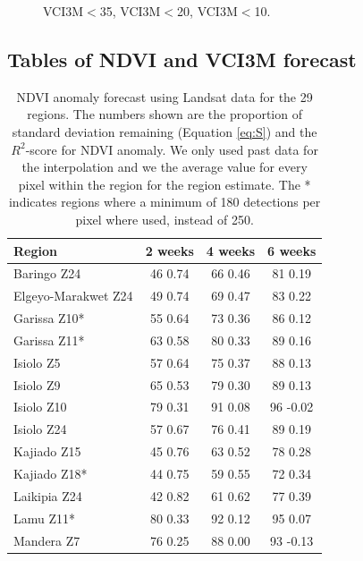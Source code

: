 \documentclass[review]{elsarticle}
\begin{document}
\begin{figure}
	\caption{ VCI3M$<$35,  VCI3M$<$20, VCI3M$<$10.} \label{fig:ROCotherdrought}
\end{figure}



\newpage
\subsection{Tables of NDVI and VCI3M forecast} \label{app}

\begin{table}
	\footnotesize
	\caption{NDVI anomaly forecast using Landsat data for the 29 regions. The numbers shown are the proportion of standard deviation remaining (Equation \ref{eq:S}) and the $R^2$-score for NDVI anomaly. We only used past data for the interpolation and we the average value for every pixel within the region for the region estimate. The * indicates regions where a minimum of 180 detections per pixel where used, instead of 250. } \label{tab:NDVI_LS}
	\centering
	\begin{tabular}{l|ccc} 
		\toprule
		\textbf{Region}   & \textbf{2 weeks}  & \textbf{4 weeks}  & \textbf{6 weeks} \\
		\midrule
		Baringo Z24 & 46 0.74 & 66 0.46 & 81 0.19 \\
		Elgeyo-Marakwet Z24 & 49 0.74 & 69 0.47 & 83 0.22 \\
		Garissa Z10* & 55 0.64 & 73 0.36 & 86 0.12 \\
		Garissa Z11* & 63 0.58 & 80 0.33 & 89 0.16 \\
		Isiolo Z5 & 57 0.64 & 75 0.37 & 88 0.13 \\
		Isiolo Z9 & 65 0.53 & 79 0.30 & 89 0.13 \\
		Isiolo Z10 & 79 0.31 & 91 0.08 & 96 -0.02 \\
		Isiolo Z24 & 57 0.67 & 76 0.41 & 89 0.19 \\
		Kajiado Z15 & 45 0.76 & 63 0.52 & 78 0.28 \\
		Kajiado Z18* & 44 0.75 & 59 0.55 & 72 0.34 \\
		Laikipia Z24 & 42 0.82 & 61 0.62 & 77 0.39 \\
		Lamu Z11* & 80 0.33 & 92 0.12 & 95 0.07 \\
		Mandera Z7 & 76 0.25 & 88 0.00 & 93 -0.13 \\

\end{tabular}
\end{table}
\end{document}
